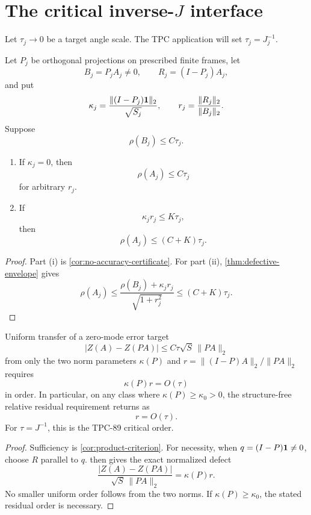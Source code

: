 \section{The critical inverse-\texorpdfstring{\(J\)}{J} interface}
\label{sec:critical-interface}

Let \(\tau_j\to0\) be a target angle scale.  The TPC application
will set \(\tau_j=J_j^{-1}\).

\begin{theorem}
\label{thm:critical-dichotomy}
Let \(P_j\) be orthogonal projections on prescribed finite frames,
let
\[
 B_j=P_jA_j\ne0,\qquad
 R_j=(I-P_j)A_j,
\]
and put
\[
 \kappa_j
 =
 \frac{\|(I-P_j)\mathbf 1\|_2}{\sqrt{S_j}},
\qquad
 r_j=\frac{\|R_j\|_2}{\|B_j\|_2}.
\]
Suppose
\[
 \rho(B_j)\le C\tau_j.
\]
\begin{enumerate}[label=(\roman*),leftmargin=2.2em]
\item If \(\kappa_j=0\), then
  \[
  \rho(A_j)\le C\tau_j
  \]
  for arbitrary \(r_j\).
\item If
  \[
  \kappa_jr_j\le K\tau_j,
  \]
  then
  \[
  \rho(A_j)\le(C+K)\tau_j.
  \]
\end{enumerate}
\end{theorem}

\begin{proof}
Part (i) is \cref{cor:no-accuracy-certificate}.  For part (ii),
\cref{thm:defective-envelope} gives
\[
 \rho(A_j)
 \le
 \frac{\rho(B_j)+\kappa_jr_j}{\sqrt{1+r_j^2}}
 \le(C+K)\tau_j.
\]
\end{proof}

\begin{theorem}
\label{thm:critical-sharpness}
Uniform transfer of a zero-mode error target
\[
 |Z(A)-Z(PA)|
 \le C\tau\sqrt S\,\|PA\|_2
\]
from only the two norm parameters \(\kappa(P)\) and
\(r=\|(I-P)A\|_2/\|PA\|_2\) requires
\[
 \kappa(P)r=O(\tau)
\]
in order.  In particular, on any class where
\(\kappa(P)\ge\kappa_0>0\), the structure-free relative residual
requirement returns as
\[
 r=O(\tau).
\]
For \(\tau=J^{-1}\), this is the TPC-89 critical order.
\end{theorem}

\begin{proof}
Sufficiency is \cref{cor:product-criterion}.  For necessity, when
\(q=(I-P)\mathbf 1\ne0\), choose \(R\) parallel to \(q\).
 then gives the exact normalized defect
\[
 \frac{|Z(A)-Z(PA)|}{\sqrt S\,\|PA\|_2}
 =\kappa(P)r.
\]
No smaller uniform order follows from the two norms.  If
\(\kappa(P)\ge\kappa_0\), the stated residual order is necessary.
\end{proof}

